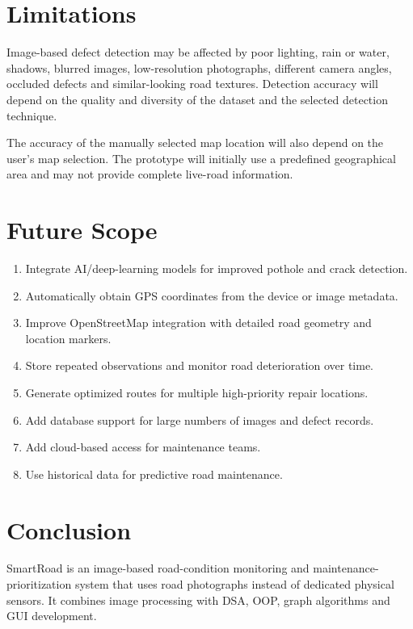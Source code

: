 \documentclass[12pt,a4paper]{article}
\begin{document}
\section{Limitations}

Image-based defect detection may be affected by poor lighting, rain or water, shadows, blurred images, low-resolution photographs, different camera angles, occluded defects and similar-looking road textures. Detection accuracy will depend on the quality and diversity of the dataset and the selected detection technique.

The accuracy of the manually selected map location will also depend on the user's map selection. The prototype will initially use a predefined geographical area and may not provide complete live-road information.

\section{Future Scope}

\begin{enumerate}[leftmargin=*]
    \item Integrate AI/deep-learning models for improved pothole and crack detection.
    \item Automatically obtain GPS coordinates from the device or image metadata.
    \item Improve OpenStreetMap integration with detailed road geometry and location markers.
    \item Store repeated observations and monitor road deterioration over time.
    \item Generate optimized routes for multiple high-priority repair locations.
    \item Add database support for large numbers of images and defect records.
    \item Add cloud-based access for maintenance teams.
    \item Use historical data for predictive road maintenance.
\end{enumerate}

\section{Conclusion}

SmartRoad is an image-based road-condition monitoring and maintenance-prioritization system that uses road photographs instead of dedicated physical sensors. It combines image processing with DSA, OOP, graph algorithms and GUI development.
\end{document}
